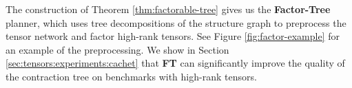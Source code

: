 


The construction of Theorem \ref{thm:factorable-tree} gives us the \textbf{Factor-Tree} planner, which uses tree decompositions of the structure graph to preprocess the tensor network and factor high-rank tensors. See Figure \ref{fig:factor-example} for an example of the preprocessing. We show in Section \ref{sec:tensors:experiments:cachet} that \textbf{FT} can significantly improve the quality of the contraction tree on benchmarks with high-rank tensors.